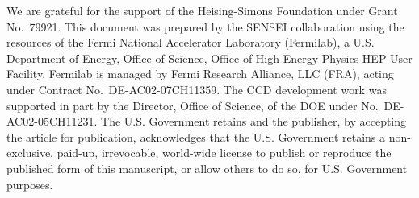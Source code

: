 \documentclass[aps, prapplied,twocolumn,showpacs,superscriptaddress,preprintnumbers, longbibliography,nofootinbib,floatfix]{revtex4-2}
\begin{document}
\begin{acknowledgments}
We are grateful for the support of the Heising-Simons Foundation under Grant No.~79921. This document was prepared by the SENSEI collaboration using the resources of the Fermi National Accelerator Laboratory (Fermilab), a U.S. Department of Energy, Office of Science, Office of High Energy Physics HEP User Facility. Fermilab is managed by Fermi Research Alliance, LLC (FRA), acting under Contract No.~DE-AC02-07CH11359.
The CCD development work was supported in part by the Director, Office of Science, of the DOE under No.~DE-AC02-05CH11231.
The U.S. Government retains and the publisher, by accepting the article for publication, acknowledges that the U.S. Government retains a non-exclusive, paid-up, irrevocable, world-wide license to publish or reproduce the published form of this manuscript, or allow others to do so, for U.S. Government purposes.
\end{acknowledgments}



%

%
\end{document}
